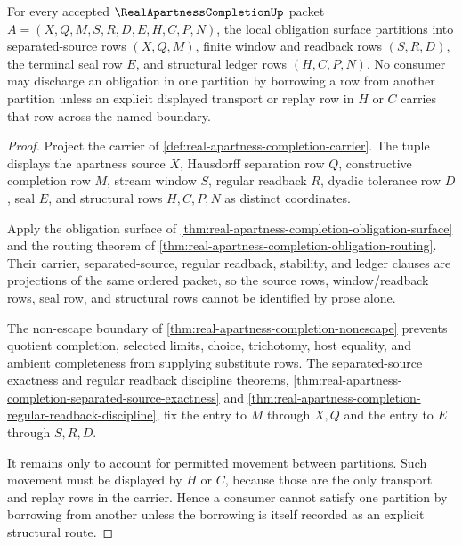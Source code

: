 \begin{theorem}
\label{thm:real-apartness-completion-obligation-partition}
For every accepted $\RealApartnessCompletionUp$ packet $A=(X,Q,M,S,R,D,E,H,C,P,N)$, the local obligation surface partitions into separated-source rows $(X,Q,M)$, finite window and readback rows $(S,R,D)$, the terminal seal row $E$, and structural ledger rows $(H,C,P,N)$. No consumer may discharge an obligation in one partition by borrowing a row from another partition unless an explicit displayed transport or replay row in $H$ or $C$ carries that row across the named boundary.
\end{theorem}
\begin{proof}
Project the carrier of \autoref{def:real-apartness-completion-carrier}. The tuple displays the apartness source $X$, Hausdorff separation row $Q$, constructive completion row $M$, stream window $S$, regular readback $R$, dyadic tolerance row $D$, seal $E$, and structural rows $H,C,P,N$ as distinct coordinates.

Apply the obligation surface of \autoref{thm:real-apartness-completion-obligation-surface} and the routing theorem of \autoref{thm:real-apartness-completion-obligation-routing}. Their carrier, separated-source, regular readback, stability, and ledger clauses are projections of the same ordered packet, so the source rows, window/readback rows, seal row, and structural rows cannot be identified by prose alone.

The non-escape boundary of \autoref{thm:real-apartness-completion-nonescape} prevents quotient completion, selected limits, choice, trichotomy, host equality, and ambient completeness from supplying substitute rows. The separated-source exactness and regular readback discipline theorems, \autoref{thm:real-apartness-completion-separated-source-exactness} and \autoref{thm:real-apartness-completion-regular-readback-discipline}, fix the entry to $M$ through $X,Q$ and the entry to $E$ through $S,R,D$.

It remains only to account for permitted movement between partitions. Such movement must be displayed by $H$ or $C$, because those are the only transport and replay rows in the carrier. Hence a consumer cannot satisfy one partition by borrowing from another unless the borrowing is itself recorded as an explicit structural route.
\end{proof}

